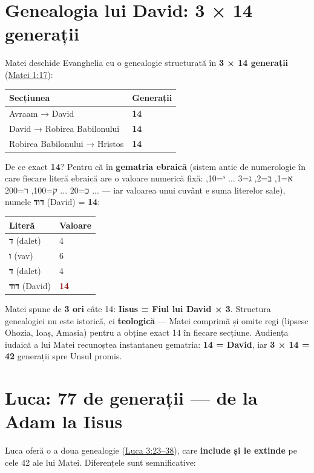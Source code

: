 \documentclass[12pt,a4paper,twoside,openany]{book}
\begin{document}
\section{Genealogia lui David: 3 × 14 generații}\label{genealogii}
Matei deschide Evanghelia cu o genealogie structurată în \textbf{3 × 14 generații} (\href{https://bibliaortodoxa.ro/carte.php?id=55\&cap=1\#17}{Matei 1:17}):

\begin{center}
\small
\begin{tabular}{L{11.5cm}L{3.6cm}}
\toprule
{}
\textbf{Secțiunea} & \textbf{Generații} \\
\midrule
Avraam → David & \textbf{14} \\
David → Robirea Babilonului & \textbf{14} \\
Robirea Babilonului → Hristos & \textbf{14} \\
\bottomrule
\end{tabular}
\end{center}
\normalsize
De ce exact \textbf{14}? Pentru că în \textbf{gematria ebraică} (sistem antic de numerologie în care fiecare literă ebraică are o valoare numerică fixă: א=1, ב=2, ג=3 ... י=10, כ=20 ... ק=100, ר=200 ... — iar valoarea unui cuvânt e suma literelor sale), numele \textbf{דוד} (David) = \textbf{14}:

\begin{center}
\small
\begin{tabular}{L{8.9cm}L{6.2cm}}
\toprule
{}
\textbf{Literă} & \textbf{Valoare} \\
\midrule
\textbf{ד} (dalet) & 4 \\
\textbf{ו} (vav) & 6 \\
\textbf{ד} (dalet) & 4 \\
\textbf{דוד} (David) & \textcolor{darkred}{\textbf{14}} \\
\bottomrule
\end{tabular}
\end{center}
\normalsize
Matei spune de \textbf{3 ori} câte 14: \textbf{Iisus = Fiul lui David × 3}. Structura genealogiei nu este istorică, ci \textbf{teologică} — Matei comprimă și omite regi (lipsesc Ohozia, Ioaș, Amasia) pentru a obține exact 14 în fiecare secțiune. Audiența iudaică a lui Matei recunoștea instantaneu gematria: \textbf{14 = David}, iar \textbf{3 × 14 = 42} generații spre Unsul promis.


\section{Luca: 77 de generații — de la Adam la Iisus}
Luca oferă o a doua genealogie (\href{https://bibliaortodoxa.ro/carte.php?id=48\&cap=3\#23}{Luca 3:23–38}), care \textbf{include și le extinde} pe cele 42 ale lui Matei. Diferențele sunt semnificative:
\end{document}
